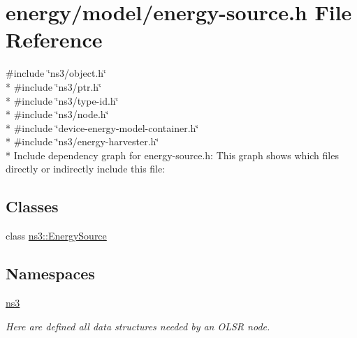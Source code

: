 \hypertarget{energy-source_8h}{}\section{energy/model/energy-\/source.h File Reference}
\label{energy-source_8h}
{\ttfamily \#include \char`\"{}ns3/object.\+h\char`\"{}}\\*
{\ttfamily \#include \char`\"{}ns3/ptr.\+h\char`\"{}}\\*
{\ttfamily \#include \char`\"{}ns3/type-\/id.\+h\char`\"{}}\\*
{\ttfamily \#include \char`\"{}ns3/node.\+h\char`\"{}}\\*
{\ttfamily \#include \char`\"{}device-\/energy-\/model-\/container.\+h\char`\"{}}\\*
{\ttfamily \#include \char`\"{}ns3/energy-\/harvester.\+h\char`\"{}}\\*
Include dependency graph for energy-\/source.h\+:
This graph shows which files directly or indirectly include this file\+:
\subsection*{Classes}
\begin{DoxyCompactItemize}
\item 
class \hyperlink{classns3_1_1EnergySource}{ns3\+::\+Energy\+Source}
\end{DoxyCompactItemize}
\subsection*{Namespaces}
\begin{DoxyCompactItemize}
\item 
 \hyperlink{namespacens3}{ns3}
\begin{DoxyCompactList}\small\item\em Here are defined all data structures needed by an O\+L\+SR node. \end{DoxyCompactList}\end{DoxyCompactItemize}
